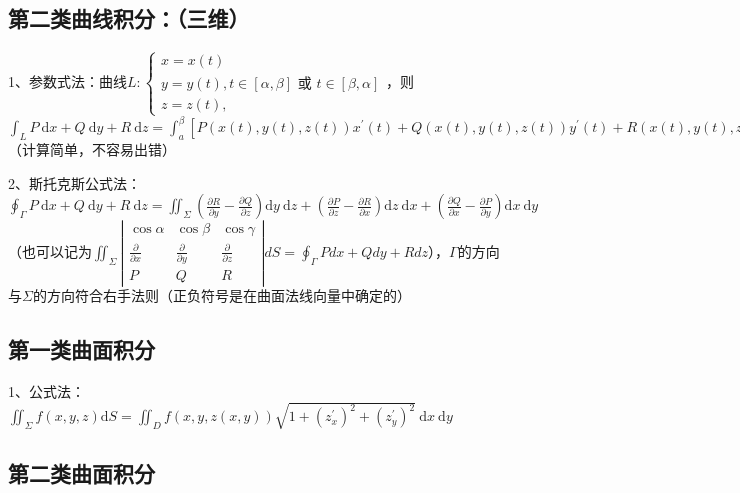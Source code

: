 \subsection{第二类曲线积分：（三维）}

1、参数式法：曲线$L:\left\{\begin{array}{l}x=x(t) \\ y=y(t), t \in[\alpha, \beta] \text { 或 } t \in[\beta, \alpha]\\ z=z(t),\end{array}\right.$，则$\int_{L} P \mathrm{~d} x+Q \mathrm{~d} y+R \mathrm{~d} z= \int_{a}^{\beta}\left[P(x(t), y(t), z(t)) x^{\prime}(t)+Q(x(t), y(t), z(t)) y^{\prime}(t)+R(x(t), y(t), z(t)) z^{\prime}(t)\right] \mathrm{d} t$（计算简单，不容易出错）

2、斯托克斯公式法：$\oint_{\Gamma} P \mathrm{~d} x+Q \mathrm{~d} y+R \mathrm{~d} z=\iint_{\Sigma}\left(\frac{\partial R}{\partial y}-\frac{\partial Q}{\partial z}\right) \mathrm{d} y \mathrm{~d} z+\left(\frac{\partial P}{\partial z}-\frac{\partial R}{\partial x}\right) \mathrm{d} z \mathrm{~d} x+\left(\frac{\partial Q}{\partial x}-\frac{\partial P}{\partial y}\right) \mathrm{d} x \mathrm{~d} y$（也可以记为$\iint_{\Sigma}\left|\begin{array}{ccc}\cos \alpha & \cos \beta & \cos \gamma \\\frac{\partial}{\partial x} & \frac{\partial}{\partial y} & \frac{\partial}{\partial z} \\P & Q & R\end{array}\right| d S=\oint_{\Gamma} P d x+Q d y+R d z$），$\Gamma$的方向与$\Sigma$的方向符合右手法则（正负符号是在曲面法线向量中确定的）



\subsection{第一类曲面积分}

1、公式法：$\iint_{\Sigma} f(x, y, z) \mathrm{d} S=\iint_{D} f(x, y, z(x, y)) \sqrt{1+\left(z_{x}^{\prime}\right)^{2}+\left(z_{y}^{\prime}\right)^{2}} \mathrm{~d} x \mathrm{~d} y$



\subsection{第二类曲面积分}

